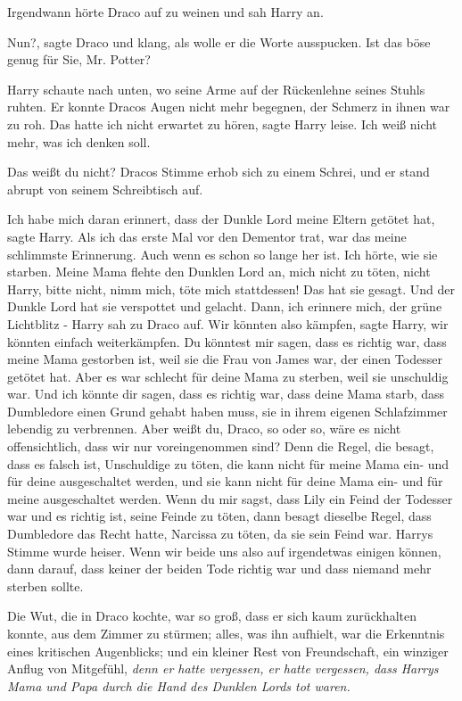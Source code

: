 Irgendwann hörte Draco auf zu weinen und sah Harry an.

\glqq{}Nun?\grqq{}, sagte Draco und klang, als wolle er die Worte ausspucken.
\glqq{}Ist das böse genug für Sie, Mr. Potter?\grqq{}

Harry schaute nach unten, wo seine Arme auf der Rückenlehne seines Stuhls
ruhten. Er konnte Dracos Augen nicht mehr begegnen, der Schmerz in ihnen war zu
roh. \glqq{}Das hatte ich nicht erwartet zu hören\grqq{}, sagte Harry leise.
\glqq{}Ich weiß nicht mehr, was ich denken soll.\grqq{}

\glqq{}Das weißt du nicht?\grqq{} Dracos Stimme erhob sich zu einem Schrei, und
er stand abrupt von seinem Schreibtisch auf.

\glqq{}Ich habe mich daran erinnert, dass der Dunkle Lord meine Eltern getötet
hat\grqq{}, sagte Harry. \glqq{}Als ich das erste Mal vor den Dementor trat, war
das meine schlimmste Erinnerung. Auch wenn es schon so lange her ist. Ich hörte,
wie sie starben. Meine Mama flehte den Dunklen Lord an, mich nicht zu töten,
nicht Harry, bitte nicht, nimm mich, töte mich stattdessen! Das hat sie gesagt.
Und der Dunkle Lord hat sie verspottet und gelacht. Dann, ich erinnere mich, der
grüne Lichtblitz -\grqq{} Harry sah zu Draco auf. \glqq{}Wir könnten also
kämpfen\grqq{}, sagte Harry, \glqq{}wir könnten einfach weiterkämpfen. Du
könntest mir sagen, dass es richtig war, dass meine Mama gestorben ist, weil
sie die Frau von James war, der einen Todesser getötet hat. Aber es war schlecht
für deine Mama zu sterben, weil sie unschuldig war. Und ich könnte dir sagen,
dass es richtig war, dass deine Mama starb, dass Dumbledore einen Grund gehabt
haben muss, sie in ihrem eigenen Schlafzimmer lebendig zu verbrennen. Aber weißt
du, Draco, so oder so, wäre es nicht offensichtlich, dass wir nur voreingenommen
sind? Denn die Regel, die besagt, dass es falsch ist, Unschuldige zu töten, die
kann nicht für meine Mama ein- und für deine ausgeschaltet werden, und sie
kann nicht für deine Mama ein- und für meine ausgeschaltet werden. Wenn du mir
sagst, dass Lily ein Feind der Todesser war und es richtig ist, seine Feinde zu
töten, dann besagt dieselbe Regel, dass Dumbledore das Recht hatte, Narcissa zu
töten, da sie sein Feind war.\grqq{} Harrys Stimme wurde heiser. \glqq{}Wenn wir
beide uns also auf irgendetwas einigen können, dann darauf, dass keiner der
beiden Tode richtig war und dass niemand mehr sterben sollte.\grqq{}

Die Wut, die in Draco kochte, war so groß, dass er sich kaum zurückhalten
konnte, aus dem Zimmer zu stürmen; alles, was ihn aufhielt, war die Erkenntnis
eines kritischen Augenblicks; und ein kleiner Rest von Freundschaft, ein
winziger Anflug von Mitgefühl, \emph{denn er hatte vergessen, er hatte
vergessen, dass Harrys Mama und Papa durch die Hand des Dunklen Lords tot
waren.}

